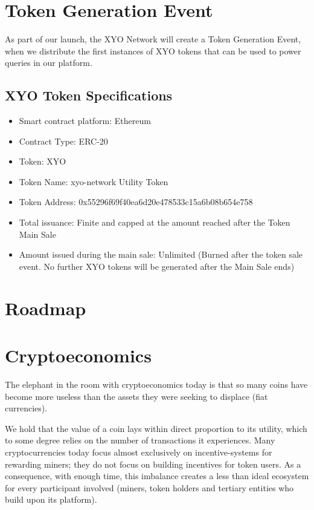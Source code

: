 \documentclass{article}
\begin{document}
\section{Token Generation Event}

As part of our launch, the XYO Network will create a Token Generation Event, when we distribute the first instances of XYO tokens that can be used to power queries in our platform.

\subsection {XYO Token Specifications}
\begin{itemize}
\item Smart contract platform: Ethereum
\item Contract Type: ERC-20
\item Token: XYO
\item Token Name: \Gls{xyo-network} Utility Token
\item Token Address: 0x55296f69f40ea6d20e478533c15a6b08b654e758
\item Total issuance: Finite and capped at the amount reached after the Token Main Sale
\item Amount issued during the main sale: Unlimited (Burned after the token sale event. No further XYO tokens will be generated after the Main Sale ends)
\end{itemize}

\section{Roadmap}


\section{Cryptoeconomics}

The elephant in the room with cryptoeconomics today is that so many coins have become more useless than the assets they were seeking to displace (fiat currencies).

We hold that the value of a coin lays within direct proportion to its utility, which to some degree relies on the number of transactions it experiences. Many cryptocurrencies today focus almost exclusively on incentive-systems for rewarding miners; they do not focus on building incentives for token users. As a consequence, with enough time, this imbalance creates a less than ideal ecosystem for every participant involved (miners, token holders and tertiary entities who build upon its platform).
\end{document}
